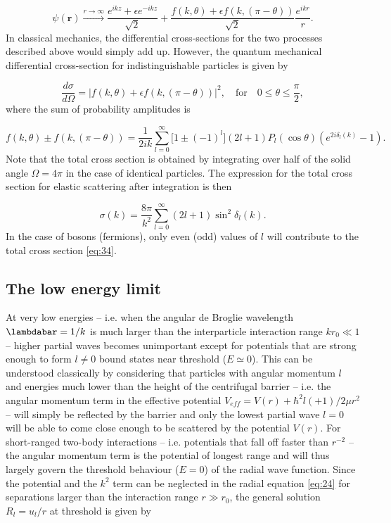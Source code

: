 \documentclass{article}
\providecommand{\abs}[1]{\lvert#1\rvert} \providecommand{\norm}[1]{\lVert#1\rVert}
\numberwithin{equation}{section}
\numberwithin{figure}{section}
\begin{document}
\begin{equation}
\psi(\mathbf{r}) \xrightarrow{r \to \infty} \frac{e^{ikz} + \epsilon e^{-ikz}}{\sqrt{2}} + \frac{f(k,\theta)+\epsilon f(k,(\pi-\theta))}{\sqrt{2}}\frac{e^{ikr}}{r}.
\end{equation}
In classical mechanics, the differential cross-sections for the two processes described above would simply add up. However, the quantum mechanical differential cross-section for indistinguishable particles is given by

\begin{equation}
\frac{d\sigma}{d\Omega} = \abs{f(k,\theta)+\epsilon f(k,(\pi-\theta))}^2, \quad \text{for} \quad 0 \leq \theta \leq \frac{\pi}{2},
\end{equation}
where the sum of probability amplitudes is

\begin{equation}
f(k,\theta) \pm f(k,(\pi-\theta)) = \frac{1}{2ik}\sum_{l=0}^{\infty} \big[1 \pm (-1)^l\big](2l+1)P_l(\cos\theta)(e^{2i\delta_l(k)} - 1).
\end{equation}
Note that the total cross section is obtained by integrating over half of the solid angle $\Omega =4\pi$ in the case of identical particles. The expression for the total cross section for elastic scattering after integration is then

\begin{equation}\label{eq:34}
\sigma(k)=
\frac{8\pi}{k^2}\sum_{l=0}^{\infty} (2l+1)\sin^2\delta_l(k). 
\end{equation}
In the case of bosons (fermions), only even (odd) values of $l$ will contribute to the total cross section \eqref{eq:34}.

\subsection{The low energy limit}
At very low energies --  i.e. when the angular de Broglie wavelength $\lambdabar = 1/k$ is much larger than the interparticle interaction range $kr_0 \ll 1$ -- higher partial waves becomes unimportant except for potentials that are strong enough to form $l\neq 0$ bound states near threshold ($E \simeq 0$). This can be understood classically by considering that particles with angular momentum $l$ and energies much lower than the height of the centrifugal barrier -- i.e. the angular momentum term in the effective potential $V_{eff} = V(r) + \hbar^2l(+1)/2\mu r^2$ -- will simply be reflected by the barrier and only the lowest partial wave $l=0$ will be able to come close enough to be scattered by the potential $V(r)$. For short-ranged two-body interactions -- i.e. potentials that fall off faster than $r^{-2}$ -- the angular momentum term is the potential of longest range and will thus largely govern the threshold behaviour ($E=0$) of the radial wave function. Since the potential and the $k^2$ term can be neglected in the radial equation \eqref{eq:24} for separations larger than the interaction range $r \gg r_0$, the general solution $R_l = u_l/r$ at threshold is given by
\end{document}

